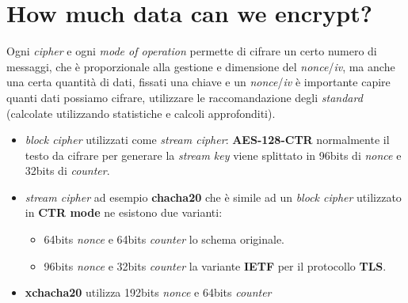 \section{How much data can we encrypt?}
Ogni \textit{cipher} e ogni \textit{mode of operation} permette di cifrare un certo numero di messaggi, che è proporzionale alla gestione e dimensione del \textit{nonce}/\textit{iv}, ma anche una certa quantità di dati, fissati una chiave e un \textit{nonce}/\textit{iv} è importante capire quanti dati possiamo cifrare, utilizzare le raccomandazione degli \textit{standard} (calcolate utilizzando statistiche e calcoli approfonditi).
\begin{itemize}[nosep]
    \item \textit{block cipher} utilizzati come \textit{stream cipher}: \textbf{AES-128-CTR} normalmente il testo da cifrare per generare la \textit{stream key} viene splittato in 96bits di \textit{nonce} e 32bits di \textit{counter}.
    \item \textit{stream cipher} ad esempio \textbf{chacha20} che è simile ad un \textit{block cipher} utilizzato in \textbf{CTR mode} ne esistono due varianti:
    \begin{itemize}[nosep]
        \item 64bits \textit{nonce} e 64bits \textit{counter} lo schema originale.
        \item 96bits \textit{nonce} e 32bits \textit{counter} la variante \textbf{IETF} per il protocollo \textbf{TLS}.
    \end{itemize}
    \item \textbf{xchacha20} utilizza 192bits \textit{nonce} e 64bits \textit{counter}
\end{itemize}